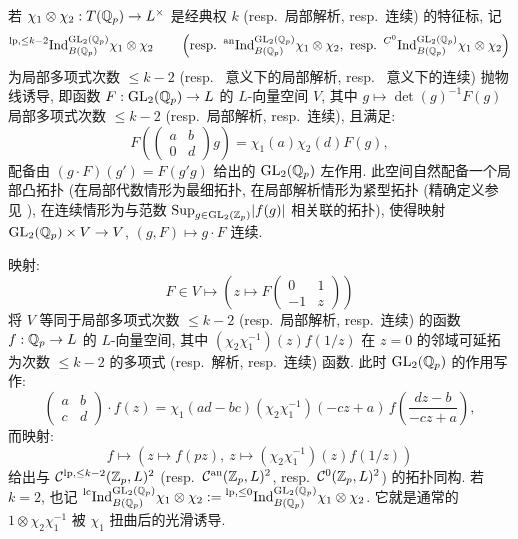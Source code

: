 若 $\chi_1 \otimes \chi_2 : T(\mathbb{Q}_p) \to L^{\times}$ 是经典权 $k$ (resp.\ 局部解析, resp.\ 连续) 的特征标, 记
\[
\pind{\mathrm{lp},\le k-2}_{B(\Qp)}^{\GL_2(\Qp)} \chi_1 \otimes \chi_2
\qquad
\left(\text{resp.}\ \anind_{B(\Qp)}^{\GL_2(\Qp)} \chi_1 \otimes \chi_2,\ \text{resp.}\ \cind_{B(\Qp)}^{\GL_2(\Qp)} \chi_1 \otimes \chi_2\right)
\]
为局部多项式次数 $\le k-2$ (resp.\ \cite[\S5,6]{ref:44} 意义下的局部解析, resp.\ \cite{ref:43} 意义下的连续) 抛物线诱导, 即函数 $F : \mathrm{GL}_2(\mathbb{Q}_p) \to L$ 的 $L$-向量空间 $V$, 其中 $g \mapsto \det(g)^{-1}F(g)$ 局部多项式次数 $\le k-2$ (resp.\ 局部解析, resp.\ 连续), 且满足:
\[
F\!\left(\begin{pmatrix} a & b \\ 0 & d \end{pmatrix}g\right) = \chi_1(a)\chi_2(d)F(g),
\]
配备由 $(g \cdot F)(g') = F(g'g)$ 给出的 $\mathrm{GL}_2(\mathbb{Q}_p)$ 左作用.
此空间自然配备一个局部凸拓扑 (在局部代数情形为最细拓扑, 在局部解析情形为紧型拓扑 (精确定义参见 \cite{ref:44}), 在连续情形为与范数 $\mathrm{Sup}_{g \in \mathrm{GL}_2(\mathbb{Z}_p)}|f(g)|$ 相关联的拓扑), 使得映射 $\mathrm{GL}_2(\mathbb{Q}_p) \times V \to V$, $(g,F) \mapsto g \cdot F$ 连续.

映射:
\[
F \in V \mapsto \left(z \mapsto F\!\begin{pmatrix} 0 & 1 \\ -1 & z \end{pmatrix}\right)
\]
将 $V$ 等同于局部多项式次数 $\le k-2$ (resp.\ 局部解析, resp.\ 连续) 的函数 $f : \mathbb{Q}_p \to L$ 的 $L$-向量空间, 其中 $(\chi_2\chi_1^{-1})(z)f(1/z)$ 在 $z = 0$ 的邻域可延拓为次数 $\le k-2$ 的多项式 (resp.\ 解析, resp.\ 连续) 函数.
此时 $\mathrm{GL}_2(\mathbb{Q}_p)$ 的作用写作:
\begin{equation}
\label{eq:1}
\begin{pmatrix} a & b \\ c & d \end{pmatrix} \cdot f(z) = \chi_1(ad-bc)(\chi_2\chi_1^{-1})(-cz+a)\,f\!\left(\frac{dz-b}{-cz+a}\right),
\end{equation}
而映射:
\[
f \mapsto \left(z \mapsto f(pz),\ z \mapsto (\chi_2\chi_1^{-1})(z)f(1/z)\right)
\]
给出与 $\mathcal{C}^{\mathrm{lp},\le k-2}(\mathbb{Z}_p,L)^{2}$ (resp.\ $\mathcal{C}^{\mathrm{an}}(\mathbb{Z}_p,L)^{2}$, resp.\ $\mathcal{C}^{0}(\mathbb{Z}_p,L)^{2}$) 的拓扑同构.
若 $k = 2$, 也记 $\prescript{\mathrm{lc}}{}{\mathrm{Ind}}_{B(\mathbb{Q}_p)}^{\mathrm{GL}_2(\mathbb{Q}_p)} \chi_1 \otimes \chi_2 := \prescript{\mathrm{lp},\le 0}{}{\mathrm{Ind}}_{B(\mathbb{Q}_p)}^{\mathrm{GL}_2(\mathbb{Q}_p)} \chi_1 \otimes \chi_2$.
它就是通常的 $1 \otimes \chi_2\chi_1^{-1}$ 被 $\chi_1$ 扭曲后的光滑诱导.

